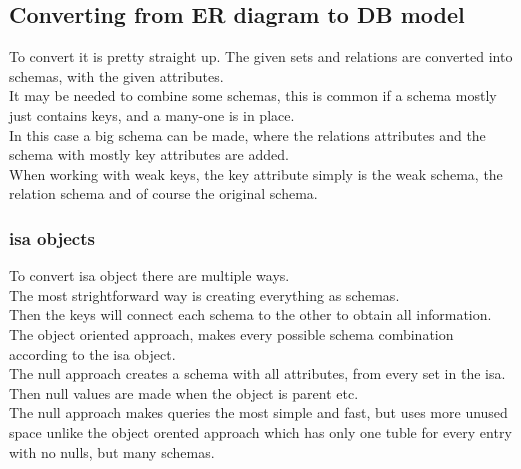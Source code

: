 \documentclass[12pt, a4paper]{article}
\begin{document}
		\subsection{Converting from ER diagram to DB model}
			To convert it is pretty straight up. The given sets and relations are converted into schemas, with the given attributes.\\
			It may be needed to combine some schemas, this is common if a schema mostly just contains keys, and a many-one is in place.\\
			In this case a big schema can be made, where the relations attributes and the schema with mostly key attributes are added.\\
			When working with weak keys, the key attribute simply is the weak schema, the relation schema and of course the original schema.
			\subsubsection{isa objects}
				To convert isa object there are multiple ways.\\
				The most strightforward way is creating everything as schemas.\\
				Then the keys will connect each schema to the other to obtain all information.\\
				The object oriented approach, makes every possible schema combination according to the isa object.\\
				The null approach creates a schema with all attributes, from every set in the isa. Then null values are made when the object is parent etc.\\
				The null approach makes queries the most simple and fast, but uses more unused space unlike the object orented approach which has only one tuble for every entry with no nulls, but many schemas.
		
				
\end{document}
